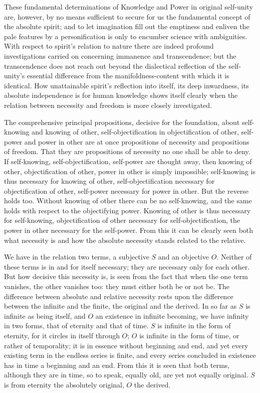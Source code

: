 \documentclass[12pt]{book}
\begin{document}
These fundamental determinations of Knowledge and Power in original self-unity are, however,
by no means sufficient to secure for us the fundamental concept of the absolute spirit; and
to let imagination fill out the emptiness and enliven the pale features by a personification
is only to encumber science with ambiguities. With respect to spirit's relation to nature
there are indeed profound investigations carried on concerning immanence and transcendence;
but the transcendence does not reach out beyond the dialectical reflection of the self-unity's
essential difference from the manifoldness-content with which it is identical. How unattainable
spirit's reflection into itself, its deep inwardness, its absolute independence is for human
knowledge shows itself clearly when the relation between necessity and freedom is more closely
investigated.

The comprehensive principal propositions, decisive for the foundation, about self-knowing and
knowing of other, self-objectification in objectification of other, self-power and power in
other are at once propositions of necessity and propositions of freedom. That they are
propositions of necessity no one shall be able to deny. If self-knowing, self-objectification,
self-power are thought away, then knowing of other, objectification of other, power in other
is simply impossible; self-knowing is thus necessary for knowing of other, self-objectification
necessary for objectification of other, self-power necessary for power in other. But the
reverse holds too. Without knowing of other there can be no self-knowing, and the same holds
with respect to the objectifying power. Knowing of other is thus necessary for self-knowing,
objectification of other necessary for self-objectification, the power in other necessary for
the self-power. From this it can be clearly seen both what necessity is and how the absolute
necessity stands related to the relative.

We have in the relation two terms, a subjective $S$ and an objective $O$. Neither of these terms
is in and for itself necessary; they are necessary only for each other. But how decisive this
necessity is, is seen from the fact that when the one term vanishes, the other vanishes too:
they must either both be or not be. The difference between absolute and relative necessity rests
upon the difference between the infinite and the finite, the original and the derived. In so far
as $S$ is infinite as being itself, and $O$ an existence in infinite becoming, we have infinity
in two forms, that of eternity and that of time. $S$ is infinite in the form of eternity, for it
circles in itself through $O$; $O$ is infinite in the form of time, or rather of temporality; it
is in essence without beginning and end, and yet every existing term in the endless series is
finite, and every series concluded in existence has in time a beginning and an end. From this it
is seen that both terms, although they are in time, so to speak, equally old, are yet not equally
original. $S$ is from eternity the absolutely original, $O$ the derived.
\end{document}
